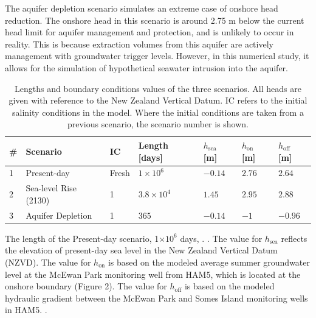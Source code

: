 \documentclass[draft, 10pt]{agujournal2019}
\begin{document}
The aquifer depletion scenario simulates an extreme case of onshore head reduction.
The onshore head in this scenario is around 2.75 m below the current head limit for aquifer management and protection, and is unlikely to occur in reality.
This is because extraction volumes from this aquifer are actively management with groundwater trigger levels.
However, in this numerical study, it allows for the simulation of hypothetical seawater intrusion into the aquifer.


\begin{table}[h!]
\centering
\caption{Lengths and boundary conditions values of the three scenarios. All heads are given with reference to the New Zealand Vertical Datum. IC refers to the initial salinity conditions in the model. Where the initial conditions are taken from a previous scenario, the scenario number is shown.}
\begin{tabular}{lllllll}
\hline
\# & Scenario & IC &Length [days] & $h_{\mathrm{sea}}$ [m] & $h_{\mathrm{on}}$ [m] & $h_{\mathrm{off}}$ [m] \\
\hline
1 & Present-day & Fresh & $1\times 10^{6}$& $-0.14$  & $2.76$ & $2.64$\\
2 & Sea-level Rise (2130) & 1 & $3.8\times 10^{4}$ & $1.45$  & $2.95$ & $2.88$\\ 
3 & Aquifer Depletion & 1 & $365$& $-0.14$  & $-1$ & $-0.96$\\
\hline
\end{tabular}
\label{tab:table_stages}
\end{table}

The length of the Present-day scenario, 1$\times10^6$ days, .
.
The value for $h_{\mathrm{sea}}$ reflects the elevation of present-day sea level in the New Zealand Vertical Datum (NZVD).
The value for $h_{\mathrm{on}}$ is based on the modeled average summer groundwater level at the McEwan Park monitoring well from HAM5, which is located at the onshore boundary (Figure 2).
The value for $h_{\mathrm{off}}$ is based on the modeled hydraulic gradient between the McEwan Park and Somes Island monitoring wells in HAM5.
.
\end{document}
